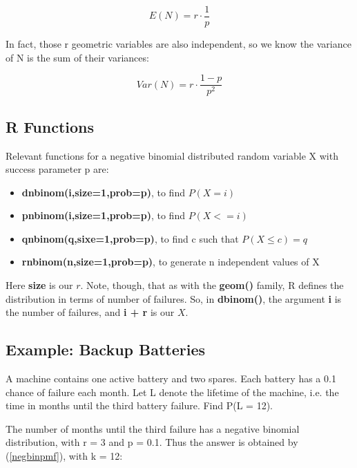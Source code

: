 \begin{equation}
\label{meannegbin}
E(N) = r \cdot \frac{1}{p}
\end{equation}

In fact, those r geometric variables are also independent, so we know
the variance of N is the sum of their variances:

\begin{equation}
Var(N) = r \cdot \frac{1-p}{p^2}
\end{equation} 

\subsection{R Functions}

Relevant functions for a negative binomial distributed random variable X
with success parameter p are:

\begin{itemize}

\item {\bf dnbinom(i,size=1,prob=p)}, to find $P(X = i)$

\item {\bf pnbinom(i,size=1,prob=p)}, to find $P(X <= i)$

\item {\bf qnbinom(q,sixe=1,prob=p)}, to find c such that $P(X \leq c) = q$

\item {\bf rnbinom(n,size=1,prob=p)}, to generate n independent values of X

\end{itemize}

Here {\bf size} is our $r$.  Note, though, that as with the {\bf geom()}
family, R defines the distribution in terms of number of failures.  So,
in {\bf dbinom()}, the argument {\bf i} is the number of failures, and
{\bf i + r} is our $X$.

\subsection{Example:  Backup Batteries}

A machine contains one active battery and two spares.  Each
battery has a 0.1 chance of failure each month.  Let L denote the
lifetime of the machine, i.e. the time in months until the third battery
failure.  Find P(L = 12).

The number of months until the third failure has a negative
binomial distribution, with r = 3 and p = 0.1.  Thus the answer is
obtained by (\ref{negbinpmf}), with k = 12:

